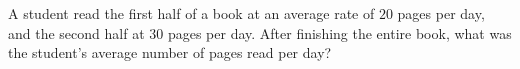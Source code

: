 A student read the first half of a book at an average rate of $20$ pages per day, and the second half at $30$ pages per day. After finishing the entire book, what was the student's average number of pages read per day?
